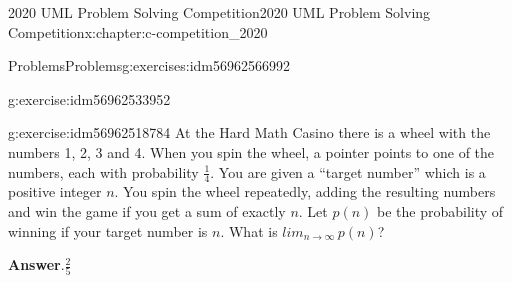 \documentclass[twoside,10pt,]{book}
\newcommand{\blocktitlefont}{\relax}
\numberwithin{equation}{section}
\begin{document}
\begin{chapterptx}{2020 UML Problem Solving Competition}{}{2020 UML Problem Solving Competition}{}{}{x:chapter:c-competition_2020}
\begin{exercises-section}{Problems}{}{Problems}{}{}{g:exercises:idm56962566992}
\begin{divisionexercise}{5}{}{}{g:exercise:idm56962533952}
\end{divisionexercise}%
\begin{divisionexercise}{6}{}{}{g:exercise:idm56962518784}%
At the Hard Math Casino there is a wheel with the numbers 1, 2, 3 and 4.  When you spin the wheel, a pointer points to one of the numbers, each with probability \(\frac{1}{4}\). You are given a “target number” which  is a positive integer \(n\). You spin the wheel repeatedly, adding the resulting  numbers and win the game if you get a sum of exactly \(n\). Let \(p(n)\) be the probability of winning if your target number is \(n\).  What is \(lim_{n\rightarrow \infty}\, p(n)\)?%
\par\smallskip%
\noindent\textbf{\blocktitlefont Answer}.\hypertarget{g:answer:idm56962513312}{}\quad{}\(\frac{2}{5}\)%
\end{divisionexercise}%
\end{exercises-section}
\end{chapterptx}
%
%
\typeout{************************************************}
\typeout{************************************************}
%
\end{document}
